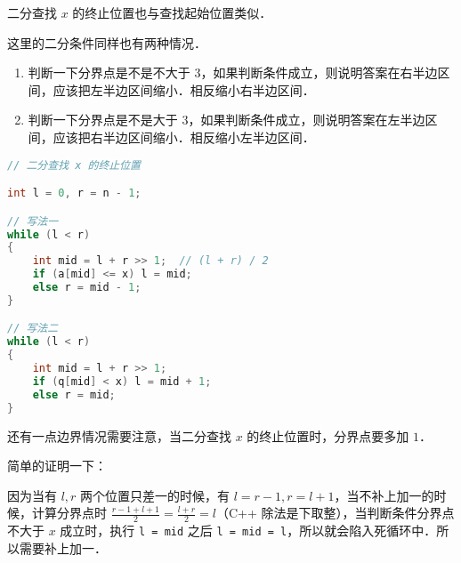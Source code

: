 二分查找 $x$ 的终止位置也与查找起始位置类似．

这里的二分条件同样也有两种情况．

\begin{enumerate}
\item 判断一下分界点是不是不大于 $3$，如果判断条件成立，则说明答案在右半边区间，应该把左半边区间缩小．相反缩小右半边区间．
\item 判断一下分界点是不是大于 $3$，如果判断条件成立，则说明答案在左半边区间，应该把右半边区间缩小．相反缩小左半边区间．
\end{enumerate}
\begin{lstlisting}[language=cpp]
// 二分查找 x 的终止位置

int l = 0, r = n - 1;

// 写法一
while (l < r)
{
	int mid = l + r >> 1;  // (l + r) / 2
    if (a[mid] <= x) l = mid;
    else r = mid - 1;
}

// 写法二
while (l < r)
{
    int mid = l + r >> 1;
    if (q[mid] < x) l = mid + 1;
    else r = mid;
}
\end{lstlisting}

还有一点边界情况需要注意，当二分查找 $x$ 的终止位置时，分界点要多加 $1$．

简单的证明一下：

因为当有 $l, r$ 两个位置只差一的时候，有 $l = r - 1, r = l + 1$，当不补上加一的时候，计算分界点时 $\frac{r - 1 + l + 1}{2} = \frac{l+r}{2}=l$（C++ 除法是下取整），当判断条件分界点不大于 $x$ 成立时，执行 \verb|l = mid| 之后 \verb|l = mid = l|，所以就会陷入死循环中．所以需要补上加一．

